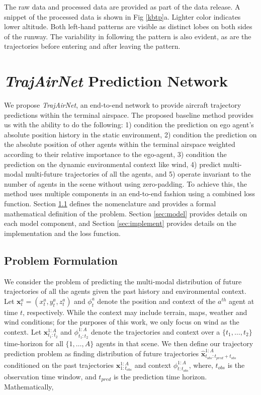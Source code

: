 \documentclass[letterpaper, 10 pt, conference]{ieeeconf}
\begin{document}
The raw data and processed data are provided as part of the data release. A snippet of the processed data is shown in Fig \ref{kbtp}a. Lighter color indicates lower altitude. Both left-hand patterns are visible as distinct lobes on both sides of the runway. The variability in following the pattern is also evident, as are the trajectories before entering and after leaving the pattern.    
\section{\textit{TrajAirNet} Prediction Network}\label{sec:trajairnet}


We propose \textit{TrajAirNet}, an end-to-end network to provide aircraft trajectory predictions within the terminal airspace. The proposed baseline method provides us with the ability to do the following: 1) condition the prediction on ego agent's absolute position history in the static environment, 2) condition the prediction on the absolute position of other agents within the terminal airspace weighted according to their relative importance to the ego-agent, 3) condition the prediction on the dynamic environmental context like wind, 4) predict multi-modal multi-future trajectories of all the agents, and 5) operate invariant to the number of agents in the scene without using zero-padding. To achieve this, the method uses multiple components in an end-to-end fashion using a combined loss function. Section \ref{sec:problem} defines the nomenclature and provides a formal mathematical definition of the problem. Section \ref{sec:model} provides details on each model component, and Section \ref{sec:implement} provides details on the implementation and the loss function. 
\subsection{Problem Formulation}\label{sec:problem}
We consider the problem of predicting the multi-modal distribution of future trajectories of all the agents given the past history and environmental context. Let $\mathbf{x}^{a}_{t} = (x_t^a,y_t^a,z_t^a)$ and $\phi_t^a$ denote the position and context of the $a^{th}$ agent at time $t$, respectively. While the context may include terrain, maps, weather and wind conditions; for the purposes of this work, we only focus on wind as the context. Let $\mathbf{x}^{1:A}_{t_1:t_2}$ and $\phi^{1:A}_{t_1:t_2}$ denote the trajectories and context over a $\{t_1, \dots , t_2\}$ time-horizon for all $\{1, \dots, A\}$ agents in that scene. We then define our trajectory prediction problem as finding distribution of future trajectories $\mathbf{\hat{x}}^{1:A}_{t_{obs}:t_{pred}+t_{obs}}$ conditioned on the past trajectories $\mathbf{{x}}^{1:A}_{1:t_{obs}}$ and context $\phi^{1:A}_{t:t_{obs}}$, where, $t_{obs}$ is the observation time window, and $t_{pred}$ is the prediction time horizon. Mathematically,     
\end{document}
